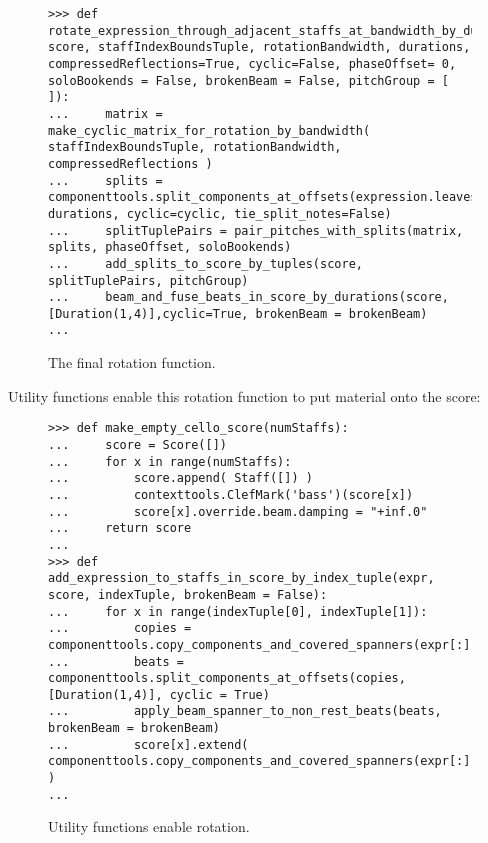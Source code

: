 \begin{figure}[H]
\begin{lstlisting}[basicstyle=\scriptsize\ttfamily, breaklines=True, tabsize=4, showtabs=false, showspaces=false]
>>> def rotate_expression_through_adjacent_staffs_at_bandwidth_by_durations(expression, score, staffIndexBoundsTuple, rotationBandwidth, durations, compressedReflections=True, cyclic=False, phaseOffset= 0, soloBookends = False, brokenBeam = False, pitchGroup = [ ]):
...     matrix = make_cyclic_matrix_for_rotation_by_bandwidth( staffIndexBoundsTuple, rotationBandwidth, compressedReflections )
...     splits = componenttools.split_components_at_offsets(expression.leaves, durations, cyclic=cyclic, tie_split_notes=False)
...     splitTuplePairs = pair_pitches_with_splits(matrix, splits, phaseOffset, soloBookends)
...     add_splits_to_score_by_tuples(score, splitTuplePairs, pitchGroup)
...     beam_and_fuse_beats_in_score_by_durations(score, [Duration(1,4)],cyclic=True, brokenBeam = brokenBeam)
... \end{lstlisting}

\caption{The final rotation function. } 
\end{figure}

Utility functions enable this rotation function to put material onto the score:

\begin{figure}[H]
\begin{lstlisting}[basicstyle=\scriptsize\ttfamily, breaklines=True, tabsize=4, showtabs=false, showspaces=false]
>>> def make_empty_cello_score(numStaffs):
...     score = Score([])
...     for x in range(numStaffs):
...         score.append( Staff([]) )
...         contexttools.ClefMark('bass')(score[x])
...         score[x].override.beam.damping = "+inf.0"
...     return score
... 
>>> def add_expression_to_staffs_in_score_by_index_tuple(expr, score, indexTuple, brokenBeam = False):
...     for x in range(indexTuple[0], indexTuple[1]):
...         copies = componenttools.copy_components_and_covered_spanners(expr[:])
...         beats = componenttools.split_components_at_offsets(copies, [Duration(1,4)], cyclic = True)
...         apply_beam_spanner_to_non_rest_beats(beats, brokenBeam = brokenBeam)
...         score[x].extend( componenttools.copy_components_and_covered_spanners(expr[:]) )
... \end{lstlisting}

\caption{Utility functions enable rotation. } 
\end{figure}

